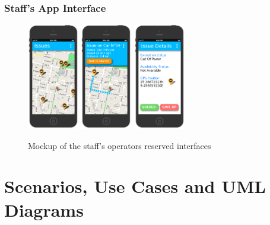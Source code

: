\documentclass[11pt]{article} %
\begin{document}
\subsubsection{Staff's App Interface}
\begin{figure}[H]
	\centering
	\includegraphics[width=0.2\textwidth]{mockup/AIssues.png} \hspace{0.8cm}
	\includegraphics[width=0.2\textwidth]{mockup/BSelectedIssue.png} \hspace{0.8cm}
	\includegraphics[width=0.2\textwidth]{mockup/CIssueDetail.png}
	\caption{Mockup of the staff's operators reserved interfaces}
\end{figure}
  

\newpage
\section{Scenarios, Use Cases and UML Diagrams}
\end{document}
